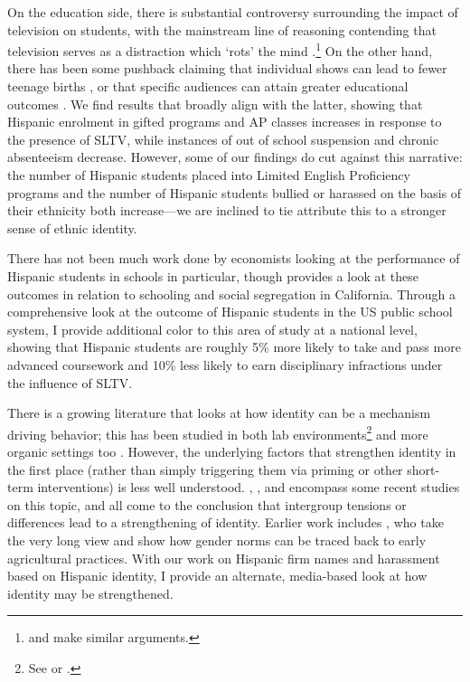 \documentclass[11pt]{article}
\begin{document}
On the education side, there is substantial controversy surrounding the impact of television on students, with the mainstream line of reasoning contending that television serves as a distraction which `rots' the mind \citep{zavodny_does_2006}.\footnote{ \cite{winn_plug-drug_2002} and \cite{gentile_well-child_2004} make similar arguments.} On the other hand, there has been some pushback claiming that individual shows can lead to fewer teenage births \citep{kearney_media_2015}, or that specific audiences can attain greater educational outcomes \citep{gentzkow_preschool_2008}. We find results that broadly align with the latter, showing that Hispanic enrolment in gifted programs and AP classes increases in response to the presence of SLTV, while instances of out of school suspension and chronic absenteeism decrease. However, some of our findings do cut against this narrative: the number of Hispanic students placed into Limited English Proficiency programs and the number of Hispanic students bullied or harassed on the basis of their ethnicity both increase---we are inclined to tie attribute this to a stronger sense of ethnic identity.

There has not been much work done by economists looking at the performance of Hispanic students in schools in particular, though \cite{cascio_cracks_2012} provides a look at these outcomes in relation to schooling and social segregation in California. Through a comprehensive look at the outcome of Hispanic students in the US public school system, I provide additional color to this area of study at a national level, showing that Hispanic students are roughly 5\% more likely to take and pass more advanced coursework and 10\% less likely to earn disciplinary infractions under the influence of SLTV.

There is a growing literature that looks at how identity can be a mechanism driving behavior; this has been studied in both lab environments\footnote{ See \cite{benjamin_social_2007} or \cite{benjamin_religious_2010}.} and more organic settings too \citep{bursztyn_moral_2015}. However, the underlying factors that strengthen identity in the first place (rather than simply triggering them via priming or other short-term interventions) is less well understood.  \cite{bisin_bend_2010}, \cite{atkin_how_2019}, and \cite{bazzi_unity_2019} encompass some recent studies on this topic, and all come to the conclusion that intergroup tensions or differences lead to a strengthening of identity. Earlier work includes \cite{@CITE ALESINA}, who take the very long view and show how gender norms can be traced back to early agricultural practices. With our work on Hispanic firm names and harassment based on Hispanic identity, I provide an alternate, media-based look at how identity may be strengthened. 
\end{document}

